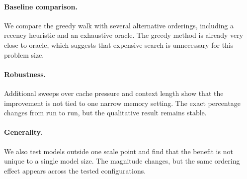 \documentclass{article}
\begin{document}
\paragraph{Baseline comparison.}
We compare the greedy walk with several alternative orderings, including a recency heuristic and an exhaustive oracle. The greedy method is already very close to oracle, which suggests that expensive search is unnecessary for this problem size.

\begin{table}[t]
\caption{Ordering baselines (RTX 4090, 195 queries). All six strategies measured in a single consistent run with one shared trace. Greedy trie achieves 97.5\% of oracle's TTFT reduction (+29.6\% vs.\ oracle's +30.3\%).}
\label{tab:baselines}
\centering
\small
{}
\vspace{-0.5em}
\end{table}

\paragraph{Robustness.} Additional sweeps over cache pressure and context length show that the improvement is not tied to one narrow memory setting. The exact percentage changes from run to run, but the qualitative result remains stable.

\paragraph{Generality.} We also test models outside one scale point and find that the benefit is not unique to a single model size. The magnitude changes, but the same ordering effect appears across the tested configurations.
\end{document}

